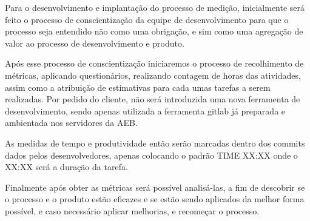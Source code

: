Para o desenvolvimento e implantação do processo de medição, inicialmente será feito o processo de conscientização da equipe de desenvolvimento para que o processo seja entendido não como uma obrigação, e sim como uma agregação de valor ao processo de desenvolvimento e produto.

Após esse processo de conscientização iniciaremos o processo de recolhimento de métricas, aplicando questionários, realizando contagem de horas das atividades, assim como a atribuição de estimativas para cada umas tarefas a serem realizadas.
Por pedido do cliente, não será introduzida uma nova ferramenta de desenvolvimento, sendo apenas utilizada a ferramenta gitlab já preparada e ambientada nos servidores da AEB.

As medidas de tempo e produtividade então serão marcadas dentro dos commits dados pelos desenvolvedores, apenas colocando o padrão TIME XX:XX onde o XX:XX será a duração da tarefa.

Finalmente após obter as métricas será possível analisá-las, a fim de descobrir se o processo e o produto estão eficazes e se estão sendo aplicados da melhor forma possível, e caso necessário aplicar melhorias, e recomeçar o processo.
